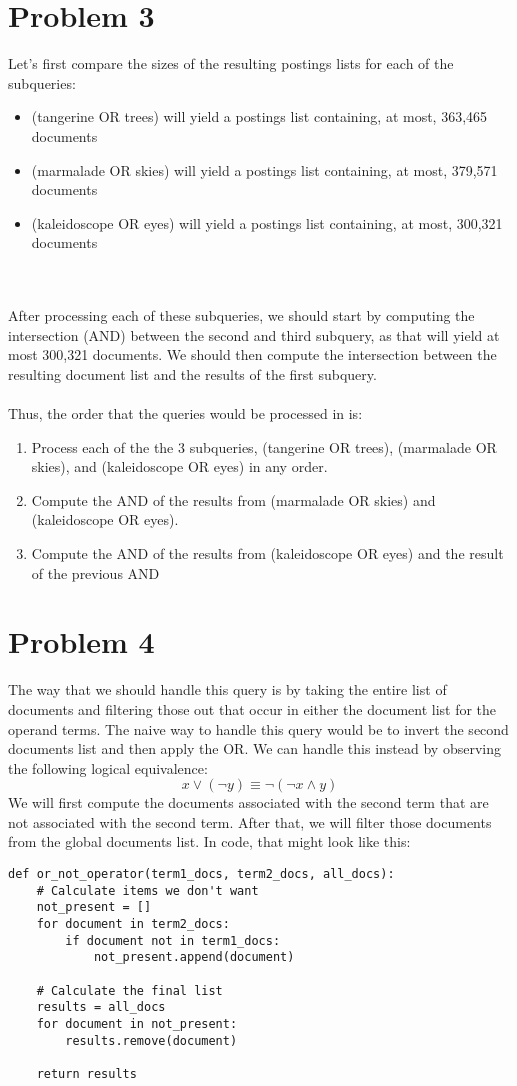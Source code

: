 \documentclass{article}%
\begin{document}
\section*{Problem 3}

Let's first compare the sizes of the resulting postings lists for each of the subqueries:
\begin{itemize}
    \item (tangerine OR trees) will yield a postings list containing, at most, 363,465 documents
    \item (marmalade OR skies) will yield a postings list containing, at most, 379,571 documents
    \item (kaleidoscope OR eyes) will yield a postings list containing, at most, 300,321 documents
\end{itemize}\\
\\
After processing each of these subqueries, we should start by computing the intersection (AND) between the second and third subquery, as that will yield at most 300,321 documents. We should then compute the intersection between the resulting document list and the results of the first subquery.\\
\\
Thus, the order that the queries would be processed in is:
\begin{enumerate}
    \item Process each of the the 3 subqueries, (tangerine OR trees), (marmalade OR skies), and (kaleidoscope OR eyes) in any order.
    \item Compute the AND of the results from (marmalade OR skies) and (kaleidoscope OR eyes).
    \item Compute the AND of the results from (kaleidoscope OR eyes) and the result of the previous AND
\end{enumerate}
\section*{Problem 4}

The way that we should handle this query is by taking the entire list of documents and filtering those out that occur in either the document list for the operand terms. The naive way to handle this query would be to invert the second documents list and then apply the OR. We can handle this instead by observing the following logical equivalence: $$x \vee (\neg y) \equiv \neg (\neg x \wedge y)$$
We will first compute the documents associated with the second term that are not associated with the second term. After that, we will filter those documents from the global documents list. In code, that might look like this:

\begin{lstlisting}[frame=single]
def or_not_operator(term1_docs, term2_docs, all_docs):
    # Calculate items we don't want
    not_present = []
    for document in term2_docs:
        if document not in term1_docs:
            not_present.append(document)

    # Calculate the final list
    results = all_docs
    for document in not_present:
        results.remove(document)

    return results
\end{lstlisting}
\end{document}
